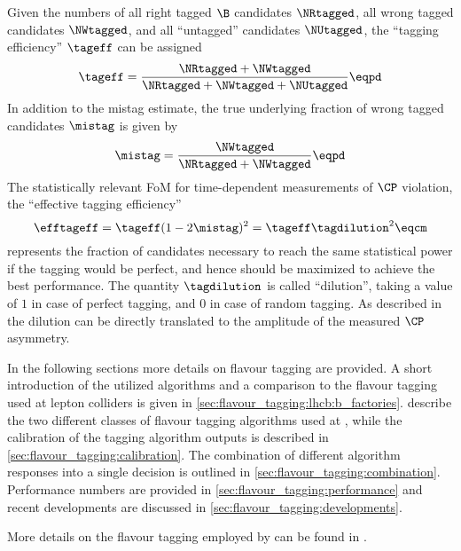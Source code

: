 Given the numbers of all right tagged $\B$ candidates $\NRtagged$, all wrong
tagged candidates $\NWtagged$, and all \enquote{untagged} candidates
$\NUtagged$, the \enquote{tagging efficiency} $\tageff$ can be assigned
%
\begin{equation}\label{eq:flavour_tagging:tageff}
  \tageff = \frac{\NRtagged + \NWtagged}{\NRtagged + \NWtagged + \NUtagged}\eqpd
\end{equation}
%
In addition to the mistag estimate, the true underlying fraction of wrong tagged
candidates $\mistag$ is given by
%
\begin{equation}\label{eq:flavour_tagging:mistag}
  \mistag = \frac{\NWtagged}{\NRtagged + \NWtagged}\eqpd
\end{equation}
%
The statistically relevant \acl{FoM} for time-dependent measurements of $\CP$
violation, the \enquote{effective tagging efficiency}
%
\begin{equation}\label{eq:flavour_tagging:efftageff}
  \efftageff = \tageff(1 - 2 \mistag)^2 = \tageff \tagdilution^2 \eqcm
\end{equation}
%
represents the fraction of candidates necessary to reach the same statistical
power if the tagging would be perfect, and hence should be maximized to achieve
the best performance. The quantity $\tagdilution$ is called \enquote{dilution},
taking a value of $1$ in case of perfect tagging, and $0$ in case of random
tagging. As described \eg in \Ref~\cite[][Ch. 10.3]{Bevan:2014iga} the dilution
can be directly translated to the amplitude of the measured $\CP$ asymmetry.

In the following sections more details on flavour tagging are provided. A short
introduction of the utilized algorithms and a comparison to the flavour tagging
used at lepton colliders is given in \cref{sec:flavour_tagging:lhcb:b_factories}.
 describe the two different
classes of flavour tagging algorithms used at \LHCb, while the calibration of
the tagging algorithm outputs is described in
\cref{sec:flavour_tagging:calibration}. The combination of different algorithm
responses into a single decision is outlined in
\cref{sec:flavour_tagging:combination}. Performance numbers are provided in
\cref{sec:flavour_tagging:performance} and recent developments are discussed in
\cref{sec:flavour_tagging:developments}.

More details on the flavour tagging employed by \LHCb can be found in
\cite{Aaij:2012mu,FT:RunI}.

